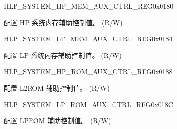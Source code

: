 \begin{register}{H}{LP\_SYSTEM\_HP\_MEM\_AUX\_CTRL\_REG}{0x0180}\label{regdesc:LPSYSTEMHPMEMAUXCTRLREG}
%
\regnewline%
\begin{regdesc}\begin{reglist}
\label{fielddesc:LPSYSTEMHPMEMAUXCTRL}\item [LP\_SYSTEM\_HP\_MEM\_AUX\_CTRL] 配置 HP 系统内存辅助控制值。 (R/W)
\end{reglist}\end{regdesc}
\end{register}


\begin{register}{H}{LP\_SYSTEM\_LP\_MEM\_AUX\_CTRL\_REG}{0x0184}\label{regdesc:LPSYSTEMLPMEMAUXCTRLREG}
%
\regnewline%
\begin{regdesc}\begin{reglist}
\label{fielddesc:LPSYSTEMLPMEMAUXCTRL}\item [LP\_SYSTEM\_LP\_MEM\_AUX\_CTRL] 配置 LP 系统内存辅助控制值。 (R/W)
\end{reglist}\end{regdesc}
\end{register}


\begin{register}{H}{LP\_SYSTEM\_HP\_ROM\_AUX\_CTRL\_REG}{0x0188}\label{regdesc:LPSYSTEMHPROMAUXCTRLREG}
%
\regnewline%
\begin{regdesc}\begin{reglist}
\label{fielddesc:LPSYSTEMHPROMAUXCTRL}\item [LP\_SYSTEM\_HP\_ROM\_AUX\_CTRL] 配置 L2ROM 辅助控制值。 (R/W)
\end{reglist}\end{regdesc}
\end{register}


\begin{register}{H}{LP\_SYSTEM\_LP\_ROM\_AUX\_CTRL\_REG}{0x018C}\label{regdesc:LPSYSTEMLPROMAUXCTRLREG}
%
\regnewline%
\begin{regdesc}\begin{reglist}
\label{fielddesc:LPSYSTEMLPROMAUXCTRL}\item [LP\_SYSTEM\_LP\_ROM\_AUX\_CTRL] 配置 LPROM 辅助控制值。 (R/W)
\end{reglist}\end{regdesc}
\end{register}


